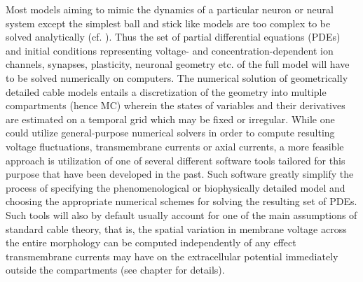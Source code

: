 Most models aiming to mimic the dynamics of a particular neuron or neural system except the simplest ball and stick like models are too complex to be solved analytically (cf. ). 
Thus the set of partial differential equations (PDEs) and initial conditions representing voltage- and concentration-dependent ion channels, synapses, plasticity, neuronal geometry etc. of the full model will have to be solved numerically on computers. 
The numerical solution of geometrically detailed cable models entails a discretization of the geometry into multiple compartments (hence MC) wherein the states of variables and their derivatives are estimated on a temporal grid which may be fixed or irregular.
While one could utilize general-purpose numerical solvers in order to compute resulting voltage fluctuations, transmembrane currents or axial currents, 
a more feasible approach is utilization of one of several different software tools tailored for this purpose that have been developed in the past.
Such software greatly simplify the process of specifying the phenomenological or biophysically detailed model and choosing the appropriate numerical schemes for solving the resulting set of PDEs. 
Such tools will also by default usually account for one of the main assumptions of standard cable theory, that is, 
the spatial variation in membrane voltage across the entire morphology can be computed independently of any effect 
transmembrane currents may have on the extracellular potential immediately outside the compartments (see chapter  for details).


